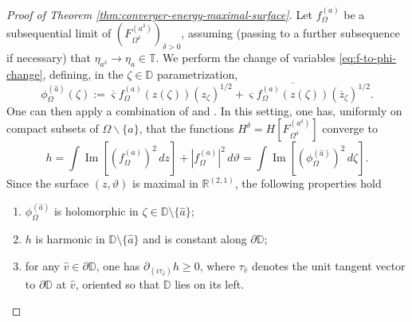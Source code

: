\documentclass[reqno]{amsart}
\numberwithin{equation}{section}
\theoremstyle{definition}
\theoremstyle{remark}
\renewcommand\Im{\operatorname{Im}}
\begin{document}
\begin{proof}[Proof of Theorem \ref{thm:converger-energy-maximal-surface}]
Let $f^{(a)}_\Omega$ be a subsequential limit of $(F^{(a^\delta)}_{\Omega^\delta})_{\delta >0}$, assuming (passing to a further subsequence if necessary) that $\eta_{a^\delta} \to \eta_a \in \mathbb{T}$. We perform the change of variables \eqref{eq:f-to-phi-change}, defining, in the $\zeta \in \mathbb{D}$ parametrization, 
\begin{equation*}
	\phi^{(\hat{a})}_\Omega (\zeta) := \overline{\varsigma} f^{(a)}_\Omega(z(\zeta)) (z_\zeta)^{1/2} + \varsigma \overline{f^{(a)}_\Omega(z(\zeta))} (\overline{z}_\zeta)^{1/2}.
\end{equation*}
One can then apply a combination of \cite[Proposition 2.21]{Che20} and \cite[Proposition~2.21]{CLR2}.
In this setting, one has, uniformly on compact subsets of $\Omega \backslash \{ a \} $, that the functions $H^\delta = H[F^{(a^\delta)}_{\Omega^\delta}]$ converge to
\begin{equation}\label{eq:change-variable-h}
h = \int \Im[(f^{(a)}_\Omega)^2\,dz] + |f^{(a)}_\Omega|^2\,d\vartheta = \int \Im[(\phi^{(\hat{a})}_\Omega)^2\,d\zeta].
\end{equation}
Since the surface $(z,\vartheta)$ is maximal in $\mathbb{R}^{(2,1)} $, the following properties hold
\begin{enumerate}
	\item $\phi^{(\hat{a})}_\Omega$ is holomorphic in $ \zeta \in \mathbb{D} \setminus \{\hat{a}\}$;
	\item $h$ is harmonic in $\mathbb{D} \setminus \{\hat{a}\}$ and is constant along $\partial \mathbb{D}$;
	\item for any $\hat{v} \in \partial \mathbb{D}$, one has $\partial_{(i\tau_{\hat{v}})}h \geq 0$, where $\tau_{\hat{v}}$ denotes the unit tangent vector to $\partial \mathbb{D}$ at $\hat{v}$, oriented so that $ \mathbb{D}$ lies on its left.
\end{enumerate}


\end{proof}
\end{document}

